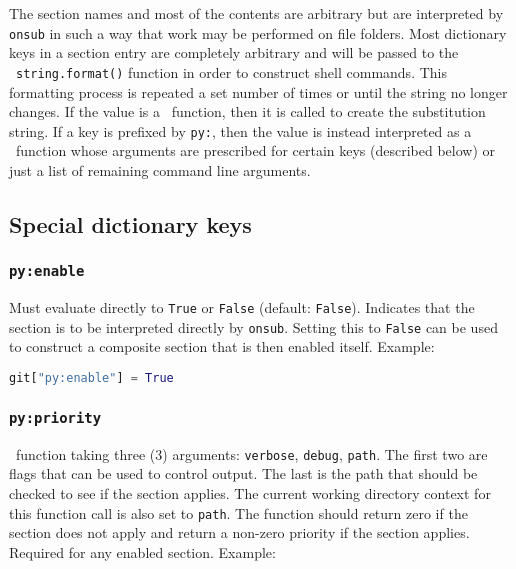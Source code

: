 The section names and most of the contents are arbitrary but are interpreted by \lstinline{onsub} in such a way that work may be performed on file folders. Most dictionary keys in a section entry are completely arbitrary and will be passed to the \Python\ \lstinline{string.format()} function in order to construct shell commands. This formatting process is repeated a set number of times or until the string no longer changes. If the value is a \Python\ function, then it is called to create the substitution string. If a key is prefixed by \lstinline{py:}, then the value is instead interpreted as a \Python\ function whose arguments are prescribed for certain keys (described below) or just a list of remaining command line arguments.

\subsection{Special dictionary keys}

\subsubsection{\lstinline{py:enable}}

Must evaluate directly to \lstinline{True} or \lstinline{False} (default: \lstinline{False}). Indicates that the section is to be interpreted directly by \lstinline{onsub}. Setting this to \lstinline{False} can be used to construct a composite section that is then enabled itself. Example:

\begin{snugshade}
\begin{lstlisting}[language=python]
git["py:enable"] = True
\end{lstlisting}
\end{snugshade}

\subsubsection{\lstinline{py:priority}}

\Python\ function taking three (3) arguments: \lstinline{verbose}, \lstinline{debug}, \lstinline{path}. The first two are flags that can be used to control output. The last is the path that should be checked to see if the section applies. The current working directory context for this function call is also set to \lstinline{path}. The function should return zero if the section does not apply and return a non-zero priority if the section applies. Required for any enabled section. Example:

